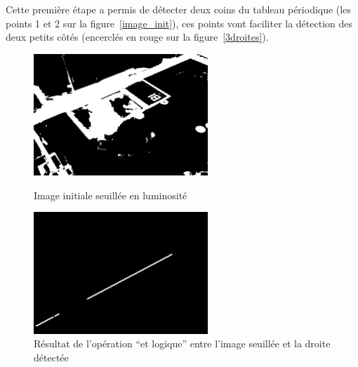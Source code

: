 \documentclass{report}
\begin{document}
Cette première étape a permis de détecter deux coins du tableau périodique (les points 1 et 2 sur la figure~\ref{image_init}), ces points vont
faciliter la détection des deux petits côtés (encerclés en rouge sur la figure~\ref{3droites}).
\begin{figure}[!h] \hfill
   \begin{minipage}[t]{.4\linewidth}
      \begin{center}
      \includegraphics[height=130pt]{image_seuillee_en_luminosite.png}  
      \end{center}
      \caption{Image initiale seuillée en luminosité}
      \label{seuillee}
   \end{minipage} \hfill
   \begin{minipage}[t]{.4\linewidth}
      \begin{center}
      \includegraphics[height=130pt]{image_droite_1.png}  
      \end{center}
      \caption{Résultat de l'opération ``et logique'' entre l'image seuillée et la droite détectée}
      \label{droite1}
   \end{minipage} \hfill \hfill
\end{figure}
\end{document}
